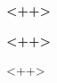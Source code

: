 \documentclass[12pt]{article}
\begin{document}
 

\begin{titlepage}
    \begin{center}
        \Huge\textbf{<++>}
         
        \vspace{10cm}
    \end{center}
\end{titlepage}

\begin{center}
    \Huge\textbf{<++>}
\end{center}

<++>

\end{document}
